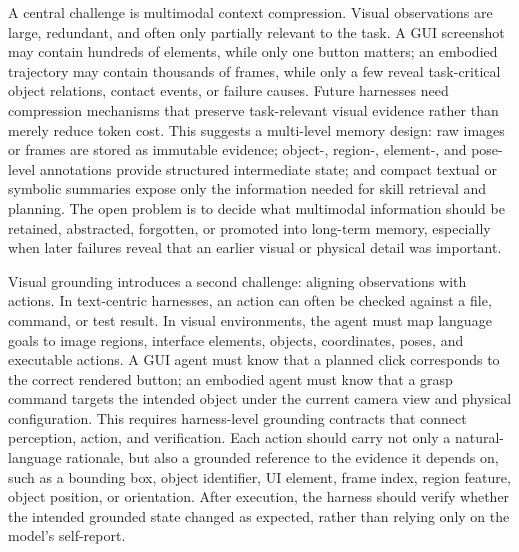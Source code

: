 A central challenge is multimodal context compression. Visual observations are large, redundant, and often only partially relevant to the task. A GUI screenshot may contain hundreds of elements, while only one button matters; an embodied trajectory may contain thousands of frames, while only a few reveal task-critical object relations, contact events, or failure causes. Future harnesses need compression mechanisms that preserve task-relevant visual evidence rather than merely reduce token cost. This suggests a multi-level memory design: raw images or frames are stored as immutable evidence; object-, region-, element-, and pose-level annotations provide structured intermediate state; and compact textual or symbolic summaries expose only the information needed for skill retrieval and planning. The open problem is to decide what multimodal information should be retained, abstracted, forgotten, or promoted into long-term memory, especially when later failures reveal that an earlier visual or physical detail was important.

Visual grounding introduces a second challenge: aligning observations with actions. In text-centric harnesses, an action can often be checked against a file, command, or test result. In visual environments, the agent must map language goals to image regions, interface elements, objects, coordinates, poses, and executable actions. A GUI agent must know that a planned click corresponds to the correct rendered button; an embodied agent must know that a grasp command targets the intended object under the current camera view and physical configuration. This requires harness-level grounding contracts that connect perception, action, and verification. Each action should carry not only a natural-language rationale, but also a grounded reference to the evidence it depends on, such as a bounding box, object identifier, UI element, frame index, region feature, object position, or orientation. After execution, the harness should verify whether the intended grounded state changed as expected, rather than relying only on the model's self-report.

